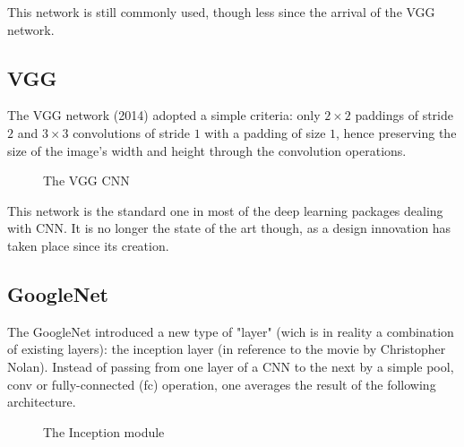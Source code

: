 This network is still commonly used, though less since the arrival of the VGG network.

\subsection{VGG}

The VGG\cite{DBLP:journals/corr/SimonyanZ14a} network (2014) adopted a simple criteria: only $2 \times 2$ paddings of stride $2$ and $3\times 3$ convolutions of stride $1$ with a padding of size $1$, hence preserving the size of the image's width and height through the convolution operations.

\begin{figure}[H]
\begin{center}
\caption{The VGG CNN}
\end{center}
\end{figure}

This network is the standard one in most of the deep learning packages dealing with CNN. It is no longer the state of the art though, as a design innovation has taken place since its creation. 

\subsection{GoogleNet}

The GoogleNet\cite{43022} introduced a new type of "layer" (wich is in reality a combination of existing layers): the inception layer (in reference to the movie by Christopher Nolan). Instead of passing from one layer of a CNN to the next by a simple pool, conv or fully-connected (fc) operation, one averages the result of the following architecture.

\begin{figure}[H]
\begin{center}
\caption{The Inception module}
\end{center}
\end{figure}

